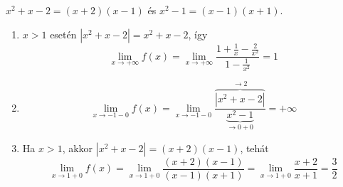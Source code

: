 \documentclass[11pt]{scrartcl}
\begin{document}
$x^2 + x - 2 = (x + 2)(x - 1)$ és $x^2 - 1 = (x - 1)(x + 1)$.
\begin{enumerate}
	\item $x > 1$ esetén $|x^2 + x - 2| = x^2 + x - 2$, így
	      \[
		      \lim_{x \to +\infty} f(x)
		      = \lim_{x \to +\infty}
		      \frac{1 + \frac{1}{x} - \frac{2}{x^2}}{1 - \frac{1}{x^2}}
		      = 1
	      \]

	\item \[
		      \lim_{x \to -1 - 0} f(x)
		      = \lim_{x \to -1 - 0}
		      \frac{\overbrace{|x^2 + x - 2|}^{\to 2}}{\underbrace{x^2 - 1}_{\to 0 + 0}}
		      = +\infty
	      \]

	\item Ha $x > 1$, akkor $|x^2 + x - 2| = (x + 2)(x - 1)$, tehát
	      \[
		      \lim_{x \to 1 + 0} f(x)
		      = \lim_{x \to 1 + 0} \frac{(x + 2)(x - 1)}{(x - 1)(x + 1)}
		      = \lim_{x \to 1 + 0} \frac{x + 2}{x + 1}
		      = \frac{3}{2}
	      \]
\end{enumerate}
\end{document}
